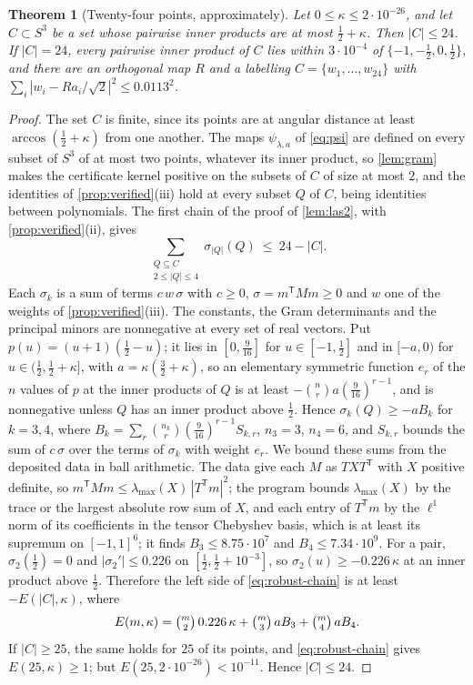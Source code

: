 \documentclass[11pt,reqno]{amsart}
\renewcommand{\_}{\origunderscore\allowbreak}
\numberwithin{equation}{section}
\theoremstyle{plain}
\newtheorem{thm}{Theorem}[section]
\theoremstyle{definition}
\theoremstyle{remark}
\begin{document}
\begin{thm}[Twenty-four points, approximately]\label{thm:m24-robust}
Let $0\le\kappa\le2\cdot10^{-26}$, and let $C\subset S^3$ be a set whose
pairwise inner products are at most $\tfrac12+\kappa$. Then $|C|\le24$. If
$|C|=24$, every pairwise inner product of $C$ lies within $3\cdot10^{-4}$
of $\{-1,-\tfrac12,0,\tfrac12\}$, and there are an orthogonal map $R$ and a
labelling $C=\{w_1,\dots,w_{24}\}$ with
$\sum_i|w_i-Ra_i/\sqrt2|^2\le0.0113^2$.
\end{thm}

\begin{proof}
The set $C$ is finite, since its points are at angular distance at least
$\arccos(\tfrac12+\kappa)$ from one another. The maps
$\psi_{\lambda,a}$ of \eqref{eq:psi} are defined on every subset of $S^3$
of at most two points, whatever its inner product, so \cref{lem:gram}
makes the certificate kernel positive on the subsets of $C$ of size at
most $2$, and the identities of \cref{prop:verified}(iii) hold at every
subset $Q$ of $C$, being identities between polynomials. The first chain
of the proof of \cref{lem:las2}, with \cref{prop:verified}(ii), gives
\begin{equation}\label{eq:robust-chain}
  \sum_{\substack{Q\subseteq C\\2\le|Q|\le4}}\sigma_{|Q|}(Q)\ \le\ 24-|C| .
\end{equation}
Each $\sigma_k$ is a sum of terms $c\,w\,\sigma$ with $c\ge0$, $\sigma=m^{\mathsf T}Mm\ge0$
and $w$ one of the weights of \cref{prop:verified}(iii). The constants,
the Gram determinants and the principal minors are nonnegative at every
set of real vectors. Put $p(u)=(u+1)(\tfrac12-u)$; it lies in
$[0,\tfrac9{16}]$ for $u\in[-1,\tfrac12]$ and in $[-a,0)$ for
$u\in(\tfrac12,\tfrac12+\kappa]$, with $a=\kappa(\tfrac32+\kappa)$, so an
elementary symmetric function $e_r$ of the $n$ values of $p$ at the inner
products of $Q$ is at least $-\binom nr a(\tfrac9{16})^{r-1}$, and is
nonnegative unless $Q$ has an inner product above $\tfrac12$. Hence
$\sigma_k(Q)\ge-aB_k$ for $k=3,4$, where $B_k=\sum_r\binom{n_k}r(\tfrac9{16})^{r-1}S_{k,r}$,
$n_3=3$, $n_4=6$, and $S_{k,r}$ bounds the sum of $c\,\sigma$ over the terms of
$\sigma_k$ with weight $e_r$. We bound these sums from the deposited data in ball arithmetic. The data give
each $M$ as $TXT^{\mathsf T}$ with $X$ positive definite, so
$m^{\mathsf T}Mm\le\lambda_{\max}(X)\,|T^{\mathsf T}m|^2$; the program bounds
$\lambda_{\max}(X)$ by the trace or the largest absolute row sum of $X$, and
each entry of $T^{\mathsf T}m$ by the $\ell^1$ norm of its coefficients in the
tensor Chebyshev basis, which is at least its supremum on $[-1,1]^6$; it finds $B_3\le8.75\cdot10^{7}$ and
$B_4\le7.34\cdot10^{9}$. For a pair, $\sigma_2(\tfrac12)=0$ and
$|\sigma_2'|\le0.226$ on $[\tfrac12,\tfrac12+10^{-3}]$, so
$\sigma_2(u)\ge-0.226\,\kappa$ at an inner product above $\tfrac12$. Therefore the
left side of \eqref{eq:robust-chain} is at least $-E(|C|,\kappa)$, where
\[
  E(m,\kappa)=\tbinom m2\,0.226\,\kappa+\tbinom m3\,aB_3+\tbinom m4\,aB_4 .
\]
If $|C|\ge25$, the same holds for $25$ of its points, and
\eqref{eq:robust-chain} gives $E(25,\kappa)\ge1$; but
$E(25,2\cdot10^{-26})<10^{-11}$. Hence $|C|\le24$.


\end{proof}
\end{document}
